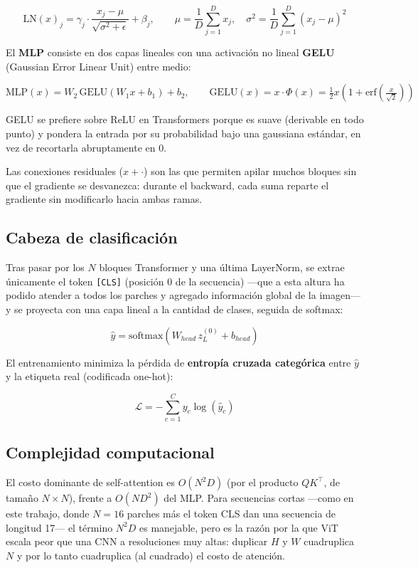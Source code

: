\documentclass[11pt,a4paper]{article}
\begin{document}
\[
\mathrm{LN}(x)_j = \gamma_j \cdot \frac{x_j - \mu}{\sqrt{\sigma^2 + \epsilon}} + \beta_j,
\qquad \mu = \frac{1}{D}\sum_{j=1}^{D} x_j, \quad \sigma^2 = \frac{1}{D}\sum_{j=1}^{D}(x_j-\mu)^2
\]

El \textbf{MLP} consiste en dos capas lineales con una activación no lineal
\textbf{GELU} (Gaussian Error Linear Unit) entre medio:

\[
\mathrm{MLP}(x) = W_2\,\mathrm{GELU}(W_1 x + b_1) + b_2, \qquad
\mathrm{GELU}(x) = x \cdot \Phi(x) = \tfrac{1}{2}x\left(1 + \mathrm{erf}\!\left(\tfrac{x}{\sqrt{2}}\right)\right)
\]

GELU se prefiere sobre ReLU en Transformers porque es suave (derivable en
todo punto) y pondera la entrada por su probabilidad bajo una gaussiana
estándar, en vez de recortarla abruptamente en 0.

Las conexiones residuales ($x + \cdot$) son las que permiten apilar muchos
bloques sin que el gradiente se desvanezca: durante el backward, cada suma
reparte el gradiente sin modificarlo hacia ambas ramas.

\subsection{Cabeza de clasificación}

Tras pasar por los $N$ bloques Transformer y una última LayerNorm, se
extrae únicamente el token \texttt{[CLS]} (posición 0 de la secuencia)
---que a esta altura ha podido atender a todos los parches y agregado
información global de la imagen--- y se proyecta con una capa lineal a la
cantidad de clases, seguida de softmax:

\[
\hat{y} = \mathrm{softmax}\left(W_{head}\, z_L^{(0)} + b_{head}\right)
\]

El entrenamiento minimiza la pérdida de \textbf{entropía cruzada
categórica} entre $\hat{y}$ y la etiqueta real (codificada one-hot):

\[
\mathcal{L} = -\sum_{c=1}^{C} y_c \log(\hat{y}_c)
\]

\subsection{Complejidad computacional}

El costo dominante de self-attention es $O(N^2 D)$ (por el producto
$QK^\top$, de tamaño $N \times N$), frente a $O(N D^2)$ del MLP. Para
secuencias cortas ---como en este trabajo, donde $N=16$ parches más el
token CLS dan una secuencia de longitud 17--- el término $N^2 D$ es
manejable, pero es la razón por la que ViT escala peor que una CNN a
resoluciones muy altas: duplicar $H$ y $W$ cuadruplica $N$ y por lo tanto
cuadruplica (al cuadrado) el costo de atención.
\end{document}
